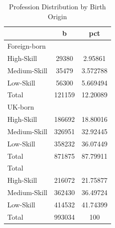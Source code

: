 \begin{table}[htbp]\centering
\def\sym#1{\ifmmode^{#1}\else\(^{#1}\)\fi}
\caption{Profession Distribution by Birth Origin}
\begin{tabular}{l*{1}{cc}}
\hline\hline
                    &           b&         pct\\
\hline
Foreign-born        &            &            \\
High-Skill          &       29380&     2.95861\\
Medium-Skill        &       35479&    3.572788\\
Low-Skill           &       56300&    5.669494\\
Total               &      121159&    12.20089\\
\hline
UK-born             &            &            \\
High-Skill          &      186692&    18.80016\\
Medium-Skill        &      326951&    32.92445\\
Low-Skill           &      358232&    36.07449\\
Total               &      871875&    87.79911\\
\hline
Total               &            &            \\
High-Skill          &      216072&    21.75877\\
Medium-Skill        &      362430&    36.49724\\
Low-Skill           &      414532&    41.74399\\
Total               &      993034&         100\\
\hline\hline
\end{tabular}
\end{table}
